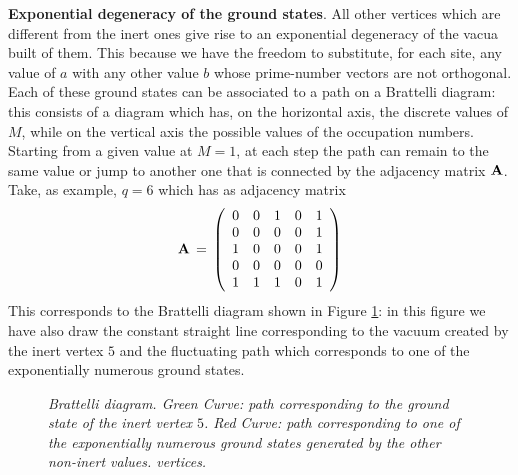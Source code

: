 \documentclass[aps,pra,superscriptaddress]{revtex4}
\newcommand\be            {\begin{equation}}
\newcommand\ee            {\end{equation}}
\renewcommand{\(}{\left(}
\renewcommand{\)}{\right)}
\renewcommand{\[}{\left[}
\renewcommand{\]}{\right]}
\begin{document}
\vspace{3mm}
\noindent
{\bf Exponential degeneracy of the ground states}. All other vertices which are different from the inert ones give rise to an exponential degeneracy of the 
vacua built of them. This because we have the freedom to substitute, for each site, any value of $a$ with any other value $b$ 
whose prime-number vectors are not orthogonal. Each of these ground states can be associated to a path on a Brattelli diagram: this consists 
of a diagram which has, on the horizontal axis, the discrete values of $M$, while on the vertical axis the possible values of the occupation numbers. 
Starting from a given value at $M=1$, at each step the path can remain to the same value or jump to another one that is connected by the 
adjacency matrix ${\bf A}$. Take, as example, $q=6$ which has as adjacency matrix 
\be
{\bf A} \,=\, 
\left(
\begin{array}{ccccc}
0 & 0 & 1 & 0 & 1 \\
0 & 0 & 0 & 0 & 1 \\
1 & 0 & 0 & 0 & 1 \\
0 & 0 & 0 & 0 & 0 \\
1 & 1 & 1 & 0 & 1 
\end{array}
\right) 
\label{incq6}
\ee  
This corresponds to the Brattelli diagram shown in Figure \ref{Brattelli}: in this figure we have also draw the constant straight line 
corresponding to the vacuum created by the inert vertex $5$ and the fluctuating path which corresponds to one of the 
exponentially numerous ground states. 



\begin{figure}[b]
\vspace{8mm}
\caption{{\em Brattelli diagram. Green Curve: path corresponding to the ground state of the inert vertex $5$. Red Curve: path corresponding to 
one of the exponentially numerous ground states generated by the other non-inert values. 
vertices. }}
\label{Brattelli}
\end{figure}
\end{document}
